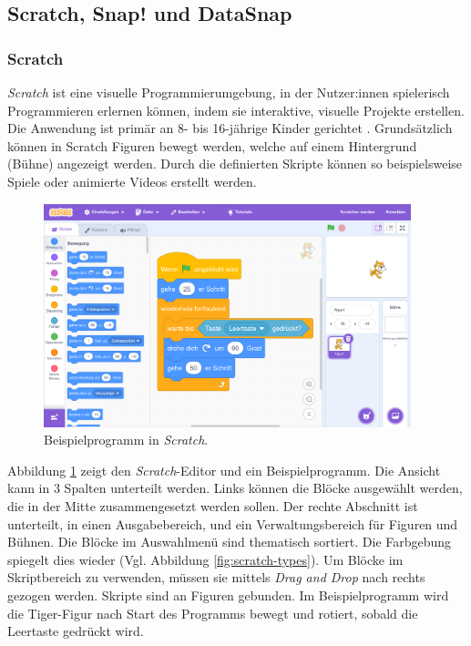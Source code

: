 \newcommand{\Scratch}{\textit{Scratch}}
\newcommand{\Snap}{\textit{Snap!}}
\newcommand{\DataSnap}{\textit{DataSnap}}

\subsection{Scratch, Snap! und DataSnap}
\subsubsection{Scratch}

\Scratch{} ist eine visuelle Programmierumgebung, in der Nutzer:innen spielerisch Programmieren erlernen können, indem sie interaktive, visuelle Projekte erstellen. Die Anwendung ist primär an 8- bis 16-jährige Kinder gerichtet \parencite{maloneyScratchProgramming2010}. Grundsätzlich können in Scratch Figuren bewegt werden, welche auf einem Hintergrund (Bühne) angezeigt werden. Durch die definierten Skripte können so beispielsweise Spiele oder animierte Videos erstellt werden.

\begin{figure}[!ht]
  \begin{center}
    \includegraphics[width=0.95\textwidth]{assets/scratch.png}
  \end{center}
  \caption{Beispielprogramm in \Scratch{}. }
  \label{fig:scratch}
\end{figure}

Abbildung \ref{fig:scratch} zeigt den \Scratch{}-Editor und ein Beispielprogramm. Die Ansicht kann in 3 Spalten unterteilt werden. Links können die Blöcke ausgewählt werden, die in der Mitte zusammengesetzt werden sollen. Der rechte Abschnitt ist unterteilt, in einen Ausgabebereich, und ein Verwaltungsbereich für Figuren und Bühnen. Die Blöcke im Auswahlmenü sind thematisch sortiert. Die Farbgebung spiegelt dies wieder (Vgl. Abbildung \ref{fig:scratch-types}). Um Blöcke im Skriptbereich zu verwenden, müssen sie mittels \textit{Drag and Drop} nach rechts gezogen werden. Skripte sind an Figuren gebunden. Im Beispielprogramm wird die Tiger-Figur nach Start des Programms bewegt und rotiert, sobald die Leertaste gedrückt wird.
\parencite{maloneyScratchProgramming2010}

